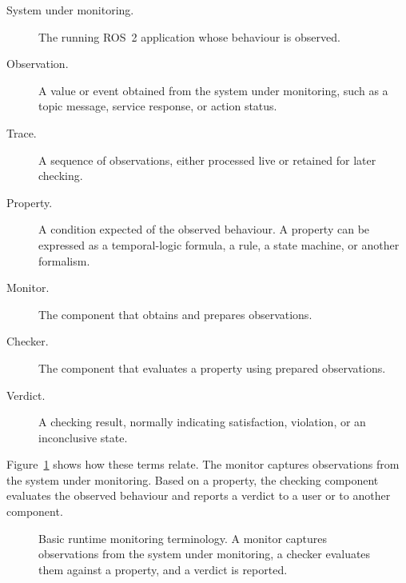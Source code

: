 \begin{description}
  \item[System under monitoring.] The running ROS~2 application whose
  behaviour is observed.

  \item[Observation.] A value or event obtained from the system under
  monitoring, such as a topic message, service response, or action status.

  \item[Trace.] A sequence of observations, either processed live or retained
  for later checking.

  \item[Property.] A condition expected of the observed behaviour. A property
  can be expressed as a temporal-logic formula, a rule, a state machine, or
  another formalism.

  \item[Monitor.] The component that obtains and prepares observations.

  \item[Checker.] The component that evaluates a property using prepared
  observations.

  \item[Verdict.] A checking result, normally indicating satisfaction,
  violation, or an inconclusive state.
\end{description}

Figure~\ref{fig:monitoring-terms} shows how these terms relate. The monitor
captures observations from the system under monitoring. Based on a property,
the checking component evaluates the observed behaviour and reports a verdict
to a user or to another component.

\begin{figure}[htbp]
\centering
{}
\caption{Basic runtime monitoring terminology. A monitor captures observations
from the system under monitoring, a checker evaluates them against a property,
and a verdict is reported.}
\label{fig:monitoring-terms}
\end{figure}

